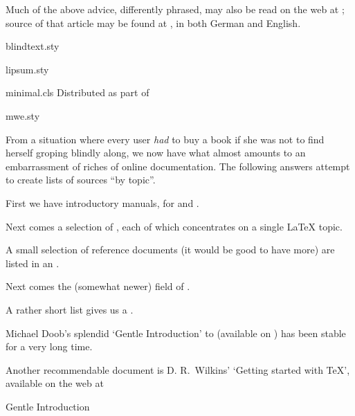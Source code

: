 Much of the above advice, differently phrased, may also be read on the
web at ; source of
that article may be found at , in
both German and English.
\begin{ctanrefs}
\item[blindtext.sty]
\item[lipsum.sty]
\item[minimal.cls]Distributed as part of 
\item[mwe.sty]
\end{ctanrefs}


From a situation where every \AllTeX{} user \emph{had} to buy a book
if she was not to find herself groping blindly along, we now have what
almost amounts to an embarrassment of riches of online documentation.
The following answers attempt to create lists of sources ``by topic''.

First we have introductory manuals, for
 and .

Next comes a selection of
,
each of which concentrates on a single \LaTeX{} topic.

A small selection of reference documents (it would be good to have
more) are listed in an .

Next comes the (somewhat newer) field of %
.

A rather short list gives us a %
.


Michael Doob's splendid `Gentle Introduction' to \plaintex{}
(available on ) has been stable for a very long time.

Another recommendable document is D. R.~Wilkins' `Getting started with \TeX{}',
available on the web at 
\begin{ctanrefs}
\item[\nothtml{\rmfamily}Gentle Introduction]
\end{ctanrefs}

